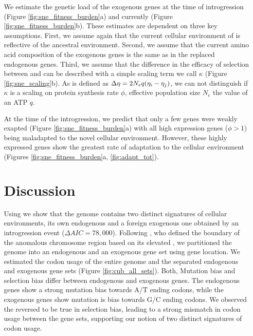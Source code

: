 \documentclass[12pt]{article}
\begin{document}
We estimate the genetic load of the exogenous genes at the time of introgression (Figure \ref{fig:sne_fitness_burden}a) and currently (Figure \ref{fig:sne_fitness_burden}b).
These estimates are dependent on three key assumptions.
First, we assume again that the current cellular environment of \gossypii is reflective of the ancestral environment.
Second, we assume that the current amino acid composition of the exogenous genes is the same as in the replaced endogenous genes.
Third, we assume that the difference in the efficacy of selection between \gossypii and \kluyveri can be described with a simple scaling term we call $\kappa$ (Figure \ref{fig:sne_scaling}b).
As \DE is defined as ${\Delta \eta} = 2N_eq(\eta_i-\eta_j)$, we can not distinguish if $\kappa$ is a scaling on protein synthesis rate $\phi$, effective population size $N_e$ the value of an ATP $q$\citep{gilchrist2015}.

At the time of the introgression, we predict that only a few genes were weakly exapted (Figure \ref{fig:sne_fitness_burden}a) with all high expression genes ($\phi > 1$) being maladapted to the novel cellular environment.
However, these highly expressed genes show the greatest rate of adaptation to the \kluyveri cellular environment (Figures \ref{fig:sne_fitness_burden}a, \ref{fig:adapt_tot}).

\section*{Discussion}

Using \ROC we show that the \kluyveri genome contains two distinct signatures of cellular environments, its own endogenous and a foreign exogenous one obtained by an introgression event ($\Delta AIC = 78,000$).
Following \citet{payen2009}, who defined the boundary of the anomalous chromosome region based on its elevated \GC, we partitioned the \kluyveri genome into an endogenous and an exogenous gene set using gene location.
We estimated the codon usage of the entire \kluyveri genome and the separated endogenous and exogenous gene sets (Figure \ref{fig:cub_all_sets}).
Both, Mutation bias and selection bias differ between endogenous and exogenous genes.
The endogenous genes show a strong mutation bias towards A/T ending codons, while the exogenous genes show mutation is bias towards G/C ending codons.
We observed the reversed to be true in selection bias, leading to a strong mismatch in codon usage between the gene sets, supporting our notion of two distinct signatures of codon usage.
\end{document}
